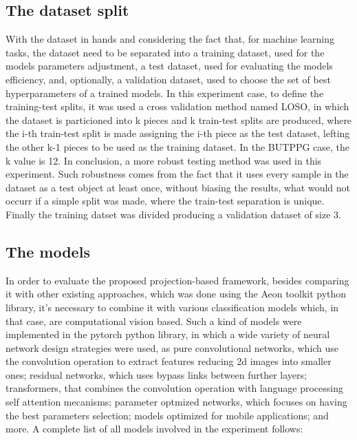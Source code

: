 \subsection{The dataset split}

With the dataset in hands and considering the fact that, for machine learning tasks, the dataset need to be separated into a training dataset, used for the models parameters adjustment, a test dataset, used for evaluating the models efficiency, and, optionally, a validation dataset, used to choose the set of best hyperparameters of a trained models. In this experiment case, to define the training-test splits, it was used a cross validation method named \acrfull{LOSO}, in which the dataset is particioned into k pieces and k train-test splits are produced, where the i-th train-test split is made assigning the i-th piece as the test dataset, lefting the other k-1 pieces to be used as the training dataset. In the \acrshort{BUTPPG} case, the k value is 12. In conclusion, a more robust testing method was used in this experiment. Such robustness comes from the fact that it uses every sample in the dataset as a test object at least once, without biasing the results, what would not occurr if a simple split was made, where the train-test separation is unique. Finally the training datset was divided producing a validation dataset of size 3.

\subsection{The models}

In order to evaluate the proposed projection-based framework, besides comparing it with other existing approaches, which was done using the Aeon toolkit python library, it's necessary to combine it with various classification models which, in that case, are computational vision based. Such a kind of models were implemented in the pytorch python library, in which a wide variety of neural network design strategies were used, as pure convolutional networks, which use the convolution operation to extract features reducing 2d images into smaller ones; residual networks, which uses bypass links between further layers; transformers, that combines the convolution operation with language processing self attention mecanisms; parameter optmized networks, which focuses on having the best parameters selection; models optimized for mobile applications; and more. A complete list of all models involved in the experiment follows:

